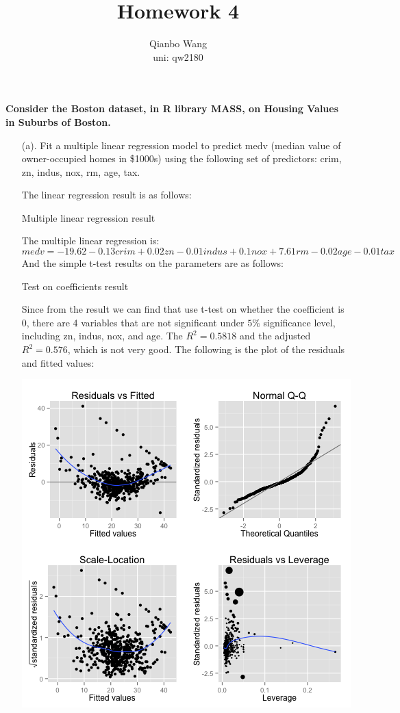 \documentclass[10pt,letterpaper]{article}
\title{\textbf {Homework 4}}
\author{{Qianbo Wang}\\{uni: qw2180}}
\date{}
\begin{document}
\maketitle
\thispagestyle{fancy}
\vspace{-2em}
{\large{\textbf{Consider the Boston dataset, in R library MASS, on Housing Values in Suburbs of Boston.}}}
\begin{enumerate}[leftmargin=0cm,itemindent=.5cm,labelwidth=\itemindent,labelsep=0cm,align=left]
\item[(a). ] Fit a multiple linear regression model to predict medv (median value of owner-occupied homes in \$1000s) using the following set of predictors: crim, zn, indus, nox, rm, age, tax.

The linear regression result is as follows:
\begin{center}
Multiple linear regression result 

\end{center}

The multiple linear regression is:  \[medv = -19.62 - 0.13crim + 0.02zn - 0.01indus + 0.1nox + 7.61rm - 0.02age - 0.01tax\] 
And the simple t-test results on the parameters are as follows: 
\begin{center}
Test on coefficients result 

\end{center}

Since from the result we can find that use t-test on whether the coefficient is 0, there are 4 variables that are not significant under $5\%$ significance level, including zn, indus, nox, and age. The $R^2 = 0.5818$ and the adjusted $R^2 = 0.576$, which is not very good.  
The following is the plot of the residuals and fitted values: \\
\begin{center}
\includegraphics[scale=0.8]{multilinear}
\end{center}


\end{enumerate}
\end{document}
